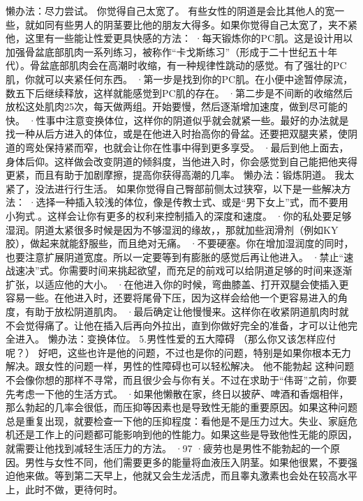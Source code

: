 \documentclass[12pt,UTF8,openany]{ctexbook}
\begin{document}
懒办法：尽力尝试。
你觉得自己太宽了。
有些女性的阴道是会比其他人的宽一些，就如同有些男人的阴茎要比他的朋友大得多。如果你觉得自己太宽了，夹不紧他，这里有一些能让性爱更具快感的方法：
·每天锻炼你的PC肌。这是设计用以加强骨盆底部肌肉一系列练习，被称作“卡戈斯练习”（形成于二十世纪五十年代）。骨盆底部肌肉会在高潮时收缩，有一种规律性跳动的感觉。有了强壮的PC肌，你就可以夹紧任何东西。
·第一步是找到你的PC肌。在小便中途暂停尿流，数五下后继续释放，这样就能感觉到PC肌的存在。
·第二步是不间断的收缩然后放松这处肌肉25次，每天做两组。开始要慢，然后逐渐增加速度，做到尽可能的快。
·性事中注意变换体位，这样你的阴道似乎就会就紧一些。最好的办法就是找一种从后方进入的体位，或是在他进入时抬高你的骨盆。还要把双腿夹紧，使阴道的弯处保持紧而窄，也就会让你在性事中得到更多享受。
·最后到他上面去，身体后仰。这样做会改变阴道的倾斜度，当他进入时，你会感觉到自己能把他夹得更紧，而且有助于加剧摩擦，提高你获得高潮的几率。
懒办法：锻炼阴道。
我太紧了，没法进行行生活。
如果你觉得自己臀部前侧太过狭窄，以下是一些解决方法：
·选择一种插入较浅的体位，像是传教士式、或是“男下女上”式，而不要用小狗式.。这样会让你有更多的权利来控制插入的深度和速度。
·你的私处要足够湿润。阴道太紧很多时候是因为不够湿润的缘故，，那就加些润滑剂（例如KY胶），做起来就能舒服些，而且绝对无痛。
·不要硬塞。你在增加湿润度的同时，也要注意扩展阴道宽度。所以一定要等到有膨胀的感觉后再让他进入。
·禁止“速战速决”式。你需要时间来挑起欲望，而充足的前戏可以给阴道足够的时间来逐渐扩张，以适应他的大小。
·在他进入你的时候，弯曲膝盖、打开双腿会使插入更容易一些。在他进入时，还要将尾骨下压，因为这样会给他一个更容易进入的角度，有助于放松阴道肌肉。
·最后确定让他慢慢来。这样你在收紧阴道肌肉时就不会觉得痛了。让他在插入后再向外拉出，直到你做好完全的准备，才可以让他完全进入。
懒办法：变换体位。
5.男性性爱的五大障碍
（那么你又该怎样应付呢？）
好吧，这些也许是他的问题，不过也是你的问题，特别是如果你根本无力解决。跟女性的问题一样，男性的性障碍也可以轻松解决。
他不能勃起
这种问题不会像你想的那样不寻常，而且很少会与你有关。不过在求助于“伟哥”之前，你要先考虑一下他的生活方式。
·如果他懒散在家，终日以披萨、啤酒和香烟相伴，那么勃起的几率会很低，而压抑等因素也是导致性无能的重要原因。如果这种问题总是重复出现，就要检查一下他的压抑程度：看他是不是压力过大。失业、家庭危机还是工作上的问题都可能影响到他的性能力。如果这些是导致他性无能的原因，就需要让他找到减轻生活压力的方法。
·97%
·疲劳也是男性不能勃起的一个原因。男性与女性不同，他们需要更多的能量将血液压入阴茎。如果他很累，不要强迫他来做。等到第二天早上，他就又会生龙活虎，而且睾丸激素也会处在较高水平上，此时不做，更待何时。
\end{document}

